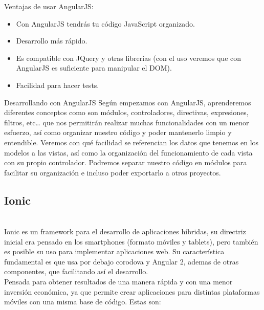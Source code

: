 \documentclass[a4paper, 11pt]{article}
\begin{document}
\begin{itemize}
            Ventajas de usar AngularJS:
            \begin{itemize}
              \item {Con AngularJS tendrás tu código JavaScript organizado.}
              \item {Desarrollo más rápido.}
              \item {Es compatible con JQuery y otras librerías (con el uso veremos que
                     con AngularJS es suficiente para manipular el DOM).}
              \item {Facilidad para hacer tests.}
            \end{itemize}

            Desarrollando con AngularJS
            Según empezamos con AngularJS, aprenderemos diferentes conceptos como son
            módulos, controladores, directivas, expresiones, filtros, etc… que nos
            permitirán realizar muchas funcionalidades con un menor esfuerzo, así como
            organizar nuestro código y poder mantenerlo limpio y entendible. Veremos
            con qué facilidad se referencian los datos que tenemos en los modelos a
            las vistas, así como la organización del funcionamiento de cada vista con
            su propio controlador. Podremos separar nuestro código en módulos para
            facilitar su organización e incluso poder exportarlo a otros proyectos.


        \subsection{Ionic}\\

            Ionic es un framework para el desarrollo de aplicaciones híbridas,
            su directriz inicial era pensado en los smartphones (formato móviles y
            tablets), pero también es posible su uso para implementar aplicaciones
            web. Su característica fundamental es que usa por debajo corodova y
            Angular 2, ademas de otras componentes, que facilitando así el
            desarrollo.\\

            Pensada para obtener resultados de una manera rápida y con una menor
            inversión económica, ya que permite crear aplicaciones para distintas
            plataformas móviles con una misma base de código. Estas son:\\


\end{itemize}
\end{document}
